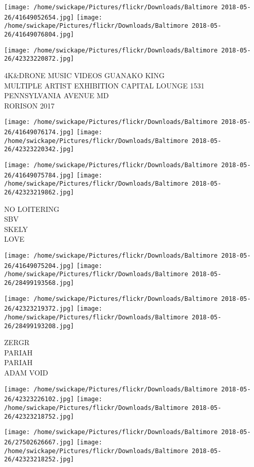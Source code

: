 \documentclass[10pt,letterpaper]{article}
\begin{document}
\texttt{[image: /home/swickape/Pictures/flickr/Downloads/Baltimore 2018-05-26/41649052654.jpg]}
\texttt{[image: /home/swickape/Pictures/flickr/Downloads/Baltimore 2018-05-26/41649076804.jpg]}

\vspace{0.25in}
\texttt{[image: /home/swickape/Pictures/flickr/Downloads/Baltimore 2018-05-26/42323220872.jpg]}

4K\&DRONE MUSIC VIDEOS GUANAKO KING\\
MULTIPLE ARTIST EXHIBITION CAPITAL LOUNGE 1531 PENNSYLVANIA AVENUE MD\\
RORISON 2017\\
\pagebreak

\texttt{[image: /home/swickape/Pictures/flickr/Downloads/Baltimore 2018-05-26/41649076174.jpg]}
\texttt{[image: /home/swickape/Pictures/flickr/Downloads/Baltimore 2018-05-26/42323220342.jpg]}

\texttt{[image: /home/swickape/Pictures/flickr/Downloads/Baltimore 2018-05-26/41649075784.jpg]}
\texttt{[image: /home/swickape/Pictures/flickr/Downloads/Baltimore 2018-05-26/42323219862.jpg]}

NO LOITERING\\
SBV\\
SKELY\\
LOVE\\
\pagebreak

\texttt{[image: /home/swickape/Pictures/flickr/Downloads/Baltimore 2018-05-26/41649075204.jpg]}
\texttt{[image: /home/swickape/Pictures/flickr/Downloads/Baltimore 2018-05-26/28499193568.jpg]}

\texttt{[image: /home/swickape/Pictures/flickr/Downloads/Baltimore 2018-05-26/42323219372.jpg]}
\texttt{[image: /home/swickape/Pictures/flickr/Downloads/Baltimore 2018-05-26/28499193208.jpg]}

ZERGR\\
PARIAH\\
PARIAH\\
ADAM VOID\\
\pagebreak

\texttt{[image: /home/swickape/Pictures/flickr/Downloads/Baltimore 2018-05-26/42323226102.jpg]}
\texttt{[image: /home/swickape/Pictures/flickr/Downloads/Baltimore 2018-05-26/42323218752.jpg]}

\texttt{[image: /home/swickape/Pictures/flickr/Downloads/Baltimore 2018-05-26/27502626667.jpg]}
\texttt{[image: /home/swickape/Pictures/flickr/Downloads/Baltimore 2018-05-26/42323218252.jpg]}
\end{document}
